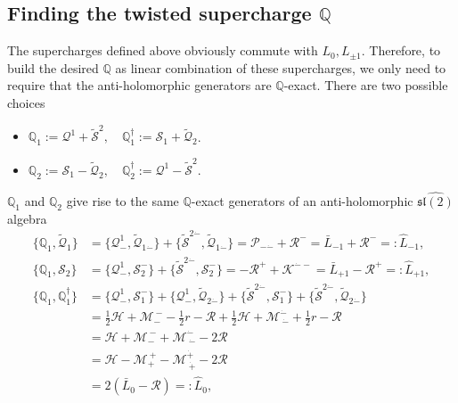 \documentclass[a4paper,11pt]{article}
\begin{document}
\subsection{Finding the twisted supercharge $\mathbb{Q}$}
The supercharges defined above obviously commute with $L_0, L_{\pm 1}$. Therefore, to build the desired $\mathbb{Q}$ as linear combination of these supercharges, we only need to require that the anti-holomorphic generators are $\mathbb{Q}$-exact. There are two possible choices
\begin{itemize}
    \item $\mathbb{Q}_1 := \mathcal{Q}^1 + \widetilde{\mathcal{S}}^2, \quad \mathbb{Q}_1^\dagger := \mathcal{S}_1 + \widetilde{\mathcal{Q}}_2$.
    \item $\mathbb{Q}_2 := \mathcal{S}_1 - \widetilde{\mathcal{Q}}_2, \quad \mathbb{Q}_2^\dagger := \mathcal{Q}^1 - \widetilde{\mathcal{S}}^2$.
\end{itemize}
$\mathbb{Q}_1$ and $\mathbb{Q}_2$ give rise to the same $\mathbb{Q}$-exact generators of an anti-holomorphic $\widehat{\mathfrak{sl}(2)}$ algebra
\begin{equation}
\begin{aligned}
    \{\mathbb{Q}_1, \widetilde{\mathcal{Q}}_1\} &= \{\mathcal{Q}^1_-, \widetilde{\mathcal{Q}}_{1 \dot{-}}\} + \{\widetilde{\mathcal{S}}^{2 \dot{-}}, \widetilde{\mathcal{Q}}_{1\dot{-}}\} = \mathcal{P}_{- \dot{-}} + \mathcal{R}^- = \bar{L}_{-1} + \mathcal{R}^- =: \widehat{L}_{-1},\\
    \{\mathbb{Q}_1, \mathcal{S}_2\} &= \{\mathcal{Q}^1_-, \mathcal{S}_2^-\} + \{\widetilde{\mathcal{S}}^{2 \dot{-}}, \mathcal{S}_2^-\} = - \mathcal{R}^+ + \mathcal{K}^{\dot{-}-} = \bar{L}_{+1} - \mathcal{R}^+ =: \widehat{L}_{+1},\\
    \{\mathbb{Q}_1, \mathbb{Q}_1^\dagger\} &= \{\mathcal{Q}^1_-, \mathcal{S}_1^-\} + \{\mathcal{Q}^1_-, \widetilde{\mathcal{Q}}_{2 \dot{-}}\} + \{\widetilde{\mathcal{S}}^{2 \dot{-}}, \mathcal{S}_1^-\} + \{\widetilde{\mathcal{S}}^{2 \dot{-}}, \widetilde{\mathcal{Q}}_{2\dot{-}}\}\\
    &= \frac{1}{2} \mathcal{H} + \mathcal{M}_-^{~-} - \frac{1}{2} r - \mathcal{R} + \frac{1}{2} \mathcal{H} + \mathcal{M}^{\dot{-}}_{~\dot{-}} + \frac{1}{2} r - \mathcal{R}\\
    &= \mathcal{H} + \mathcal{M}_-^{~-} + \mathcal{M}^{\dot{-}}_{~\dot{-}} - 2 \mathcal{R}\\
    &= \mathcal{H} - \mathcal{M}_+^{~+} - \mathcal{M}^{\dot{+}}_{~\dot{+}} - 2 \mathcal{R}\\
    &= 2(\bar{L}_0 - \mathcal{R}) = : \widehat{L}_0,
\end{aligned}
\end{equation}
\end{document}
